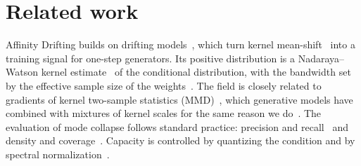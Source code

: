 \section{Related work}
\label{sec:related}

Affinity Drifting builds on drifting models~\cite{deng2026drifting}, which turn kernel
mean-shift~\cite{comaniciu2002meanshift} into a training signal for one-step generators. Its positive distribution is
a Nadaraya--Watson kernel estimate~\cite{nadaraya1964,watson1964} of the conditional distribution, with the bandwidth
set by the effective sample size of the weights~\cite{kish1965survey}. The field is closely related to gradients of
kernel two-sample statistics (MMD)~\cite{gretton2012kernel}, which generative models have combined with mixtures of
kernel scales for the same reason we do~\cite{li2017mmdgan}. The evaluation of mode collapse follows standard
practice: precision and recall~\cite{kynkaanniemi2019improved} and density and coverage~\cite{naeem2020reliable}.
Capacity is controlled by quantizing the condition and by spectral normalization~\cite{miyato2018spectral}.

